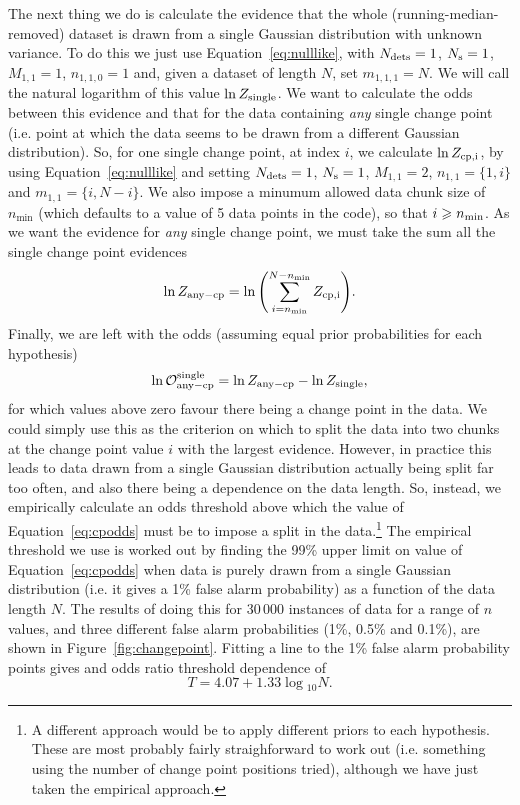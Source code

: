 The next thing we do is calculate the evidence that the whole (running-median-removed) dataset is drawn from a single
Gaussian distribution with unknown variance. To do this we just use Equation~\ref{eq:nulllike}, with $N_{\rm dets} =1$,
$N_{\rm s}=1$, $M_{1,1}=1$, $n_{1,1,0}=1$ and, given a dataset of length $N$, set $m_{1,1,1}=N$. We will call the natural logarithm
of this value $\ln{Z_{\rm single}}$. We want to calculate the odds between this evidence and that for the data containing
{\it any} single change point (i.e. point at which the data seems to be drawn from a different Gaussian distribution). So, for
one single change point, at index $i$, we calculate $\ln{Z_{\rm cp,i}}$, by using Equation~\ref{eq:nulllike} and setting
$N_{\rm dets} =1$, $N_{\rm s}=1$, $M_{1,1}=2$, $n_{1,1}=\{1,i\}$ and $m_{1,1} = \{i,N-i\}$. We also impose a minumum allowed data
chunk size of $n_{\min}$ (which defaults to a value of 5 data points in the code), so that $i \geqslant n_{\rm min}$. As we want
the evidence for {\it any} single change point, we must take the sum all the single change point evidences
\begin{equation}
 \ln{Z_{\rm any-cp}} = \ln{\left(\sum_{i=n_{\min}}^{N-n_{\rm min}} Z_{\rm cp,i} \right)}.
\end{equation}
Finally, we are left with the odds (assuming equal prior probabilities for each hypothesis)
\begin{equation}\label{eq:cpodds}
 \ln{\mathcal{O}_{\rm any-cp}^{\rm single}} = \ln{Z_{\rm any-cp}} - \ln{Z_{\rm single}},
\end{equation}
for which values above zero favour there being a change point in the data. We could simply use this as the criterion on which to
split the data into two chunks at the change point value $i$ with the largest evidence. However, in practice this leads to
data drawn from a single Gaussian distribution actually being split far too often, and also there being a dependence on the
data length. So, instead, we empirically calculate an odds threshold above which the value of Equation~\ref{eq:cpodds} must be to
impose a split in the data.\footnote{A different approach would be to apply different priors to each hypothesis. These are most
probably fairly straighforward to work out (i.e. something using the number of change point positions tried), although we have just taken
the empirical approach.} The empirical threshold we use is worked out by finding the 99\% upper limit on value of
Equation~\ref{eq:cpodds} when data is purely drawn from a single Gaussian distribution (i.e. it gives a 1\% false alarm probability)
as a function of the data length $N$. The results of doing this for 30\,000 instances of data for a range of $n$ values, and three
different false alarm probabilities (1\%, 0.5\% and 0.1\%), are shown in Figure~\ref{fig:changepoint}. Fitting a line to the 1\% false alarm
probability points gives and odds ratio threshold dependence of
\begin{equation}
 T = 4.07 + 1.33\log{}_{10}{N}.
\end{equation}

